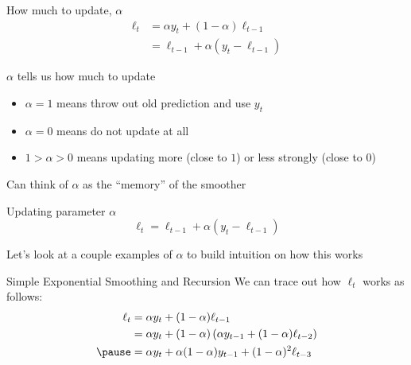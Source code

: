 \documentclass[aspectratio=169,t,11pt,table]{beamer}
\begin{document}
\begin{frame}{How much to update, $\alpha$}
  \vspace*{-\bigskipamount}
  \begin{align*}
    \ell_{t} &= \alpha y_t + (1 - \alpha) \ell_{t-1} \\
             &= \ell_{t-1} + \alpha \left( y_t - \ell_{t-1} \right)
  \end{align*}

  \bigskip
  $\alpha$ tells us how much to update
  \begin{itemize}
    \item $\alpha = 1$ means throw out old prediction and use $y_t$
    
    \item $\alpha = 0$ means do not update at all
    
    \item $1 > \alpha > 0$ means updating more (close to $1$) or less strongly (close to $0$)
  \end{itemize}

  \bigskip
  Can think of $\alpha$ as the ``memory'' of the smoother
\end{frame}

\begin{frame}{Updating parameter $\alpha$}
  \vspace*{-\bigskipamount}
  $$
    \ell_{t} = \ell_{t-1} + \alpha \left( y_t - \ell_{t-1} \right)
  $$

  \bigskip
  Let's look at a couple examples of $\alpha$ to build intuition on how this works
\end{frame}


\begin{frame}{Simple Exponential Smoothing and Recursion}
  We can trace out how $\ell_t$ works as follows:
  \begin{align*}
    \ell_{t} 
    &= \alpha y_t + (1 - \alpha) \ell_{t-1} \\
    &= \alpha y_t + (1 - \alpha) \left( \alpha y_{t-1} + (1 - \alpha) \ell_{t-2} \right) \\
    \pause
    &= \alpha y_t + \alpha (1 - \alpha) y_{t-1} + (1 - \alpha)^2 \ell_{t-3}  \\
  \end{align*}
\end{frame}
\end{document}
